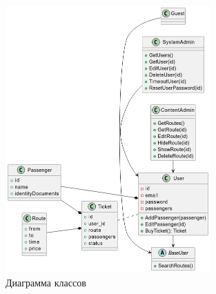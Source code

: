 \newpage
\begin{figure}[H]
    \centering
    \includegraphics[width=0.7\textwidth]{model/class.png}
    \caption{Диаграмма классов}
\end{figure}
